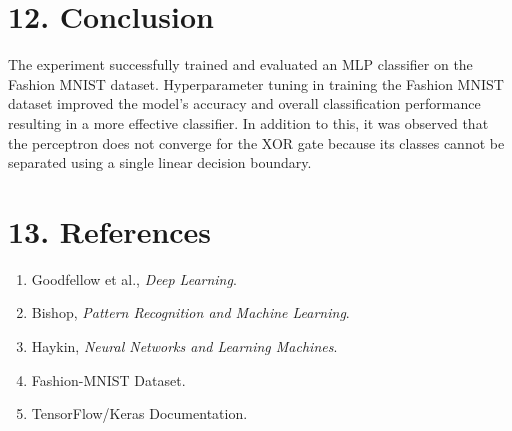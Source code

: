 \documentclass[11pt]{article}
\begin{document}
\section*{12. Conclusion}
The experiment successfully trained and evaluated an MLP classifier on the Fashion MNIST dataset.
Hyperparameter tuning in training the Fashion MNIST dataset improved the model's accuracy and overall classification performance resulting in a more effective classifier.
In addition to this, it was observed that the perceptron does not converge for the XOR gate because its classes cannot be separated using a single linear decision boundary.

\section*{13. References}
\begin{enumerate}
\item Goodfellow et al., \emph{Deep Learning}.
\item Bishop, \emph{Pattern Recognition and Machine Learning}.
\item Haykin, \emph{Neural Networks and Learning Machines}.
\item Fashion-MNIST Dataset.
\item TensorFlow/Keras Documentation.
\end{enumerate}
\end{document}
